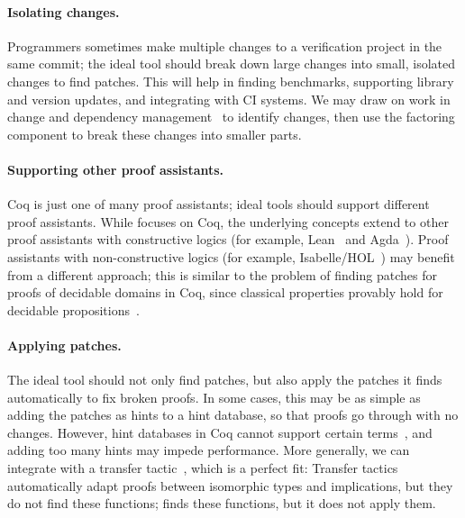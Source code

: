 \paragraph{Isolating changes.} Programmers sometimes make multiple changes to a verification project in the same commit;
the ideal tool should break down large changes into small, isolated changes to find patches.
This will help in finding benchmarks, supporting library and version updates, and integrating
with CI systems. We may draw on work in change and dependency management~\cite{873647, Autexier:2010:CMH:1986659.1986663, Celik:2017:IRP:3155562.3155588} to identify changes, then use the factoring component
to break these changes into smaller parts.

\paragraph{Supporting other proof assistants.} Coq is just one of many proof assistants;
ideal tools should support different proof assistants. While
\sysname focuses on Coq, the underlying concepts extend to other proof assistants with constructive
logics (for example, Lean~\cite{lean} and Agda~\cite{agda}).
Proof assistants with non-constructive logics (for example, Isabelle/HOL~\cite{isabellehol})
may benefit from a different approach; this is similar to the problem of finding patches for proofs of decidable domains in Coq, 
since classical properties provably hold for decidable propositions~\cite{decidable}.

\paragraph{Applying patches.} The ideal tool should not only find patches, but also apply the
patches it finds automatically to fix broken proofs. 
In some cases, this may be as simple as adding the patches as hints to a hint database, so that proofs go through with no changes.
However, hint databases in Coq cannot support certain terms~\cite{hints}, and adding too many
hints may impede performance.
More generally, we can integrate \sysname with a transfer tactic~\cite{Huffman2013, ZimmermannH15},
which is a perfect fit: 
Transfer tactics automatically adapt proofs between isomorphic types and implications, but they do
not find these functions; \sysname finds these functions, but it does not apply them.





